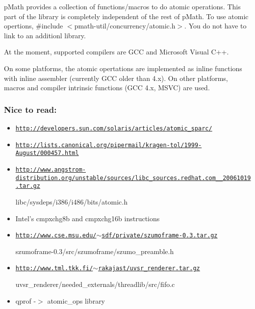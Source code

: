 pMath provides a collection of functions/macros to do atomic operations. This part of the library is completely independent of the rest of pMath. To use atomic opertions, \#include $<$pmath-util/concurrency/atomic.h$>$. You do not have to link to an additionl library.

At the moment, supported compilers are GCC and Microsoft Visual C++.

On some platforms, the atomic opertations are implemented as inline functions with inline assembler (currently GCC older than 4.x). On other platforms, macros and compiler intrinsic functions (GCC 4.x, MSVC) are used.\hypertarget{group__atomic__ops_sect_atomic_ops_ref}{}\subsubsection{Nice to read:}\label{group__atomic__ops_sect_atomic_ops_ref}
\begin{itemize}
\item \href{http://developers.sun.com/solaris/articles/atomic_sparc/}{\tt http://developers.sun.com/solaris/articles/atomic\_\-sparc/}\end{itemize}
\begin{itemize}
\item \href{http://lists.canonical.org/pipermail/kragen-tol/1999-August/000457.html}{\tt http://lists.canonical.org/pipermail/kragen-tol/1999-August/000457.html}\end{itemize}
\begin{itemize}
\item \href{http://www.angstrom-distribution.org/unstable/sources/libc_sources.redhat.com__20061019.tar.gz}{\tt http://www.angstrom-distribution.org/unstable/sources/libc\_\-sources.redhat.com\_\-\_\-20061019.tar.gz} \par
 libc/sysdeps/i386/i486/bits/atomic.h\end{itemize}
\begin{itemize}
\item Intel's cmpxchg8b and cmpxchg16b instructions\end{itemize}
\begin{itemize}
\item \href{http://www.cse.msu.edu/~sdf/private/szumoframe-0.3.tar.gz}{\tt http://www.cse.msu.edu/$\sim$sdf/private/szumoframe-0.3.tar.gz} \par
 szumoframe-0.3/src/szumoframe/szumo\_\-preamble.h\end{itemize}
\begin{itemize}
\item \href{http://www.tml.tkk.fi/~rakajast/uvsr_renderer.tar.gz}{\tt http://www.tml.tkk.fi/$\sim$rakajast/uvsr\_\-renderer.tar.gz} \par
 uvsr\_\-renderer/needed\_\-externals/threadlib/src/fifo.c\end{itemize}
\begin{itemize}
\item qprof -$>$ atomic\_\-ops library \end{itemize}


